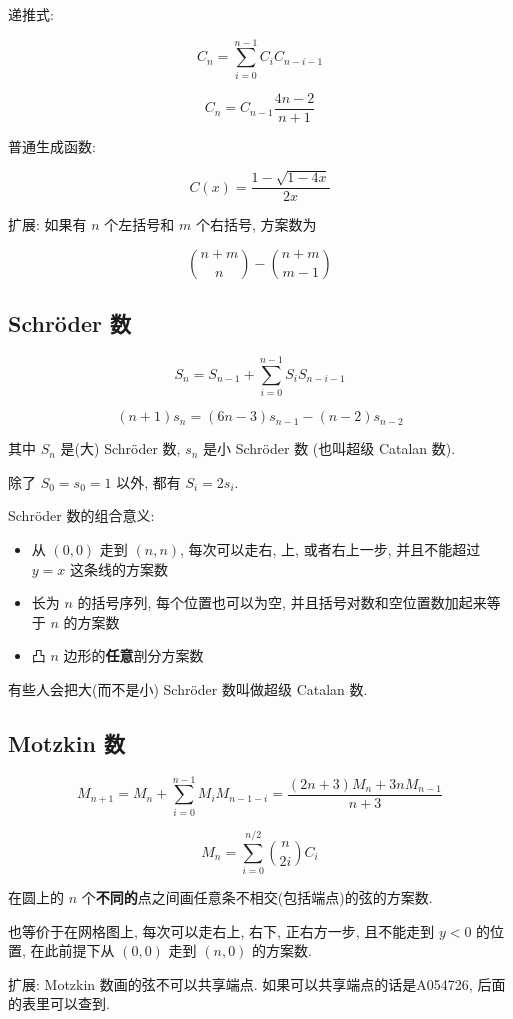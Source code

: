 递推式:

\[
    C_n = \sum_{i = 0} ^ {n - 1} C_i C_{n - i - 1}
\]

\[
    C_n = C_{n - 1} \frac {4n - 2} {n + 1}
\]

普通生成函数:

\[
    C(x) = \frac{1 - \sqrt {1 - 4 x}}{2 x}
\]

扩展: 如果有 \(n\) 个左括号和 \(m\) 个右括号, 方案数为

\[
    \binom{n + m}{n} - \binom{n + m}{m - 1}
\]

\subsection{Schr\"oder 数}
\label{sec:schroder-数}

\[
    S_n = S_{n-1} + \sum_{i = 0} ^ {n - 1} S_i S_{n - i - 1}
\]

\[
    (n + 1)s_n = (6n - 3)s_{n - 1} - (n - 2) s_{n - 2}
\]

其中 \(S_n\) 是(大) Schr\"oder 数, \(s_n\) 是小 Schr\"oder 数 (也叫超级 Catalan 数).

除了 \(S_0 = s_0 = 1\) 以外, 都有 \(S_i = 2s_i\).

Schr\"oder 数的组合意义:

\begin{itemize}
    \item 从 \((0, 0)\) 走到 \((n, n)\), 每次可以走右, 上, 或者右上一步, 并且不能超过 \(y=x\) 这条线的方案数
    \item 长为 \(n\) 的括号序列, 每个位置也可以为空, 并且括号对数和空位置数加起来等于 \(n\) 的方案数
    \item 凸 \(n\) 边形的\textbf{任意}剖分方案数
\end{itemize}

有些人会把大(而不是小) Schr\"oder 数叫做超级 Catalan 数.

\subsection{Motzkin 数}
\label{sec:motzkin-数}

\[
    M_{n + 1} = M_n + \sum_{i = 0} ^ {n - 1} M_i M_{n - 1 - i} = \frac{(2n + 3)M_n + 3n M_{n - 1}}{n + 3}
\]

\[
    M_n = \sum_{i = 0} ^ {n/2} \binom{n}{2i} C_i
\]

在圆上的 \(n\) 个\textbf{不同的}点之间画任意条不相交(包括端点)的弦的方案数.

也等价于在网格图上, 每次可以走右上, 右下, 正右方一步, 且不能走到 \(y<0\) 的位置, 在此前提下从 \((0, 0)\) 走到 \((n, 0)\) 的方案数.

扩展: Motzkin 数画的弦不可以共享端点. 如果可以共享端点的话是A054726, 后面的表里可以查到.

